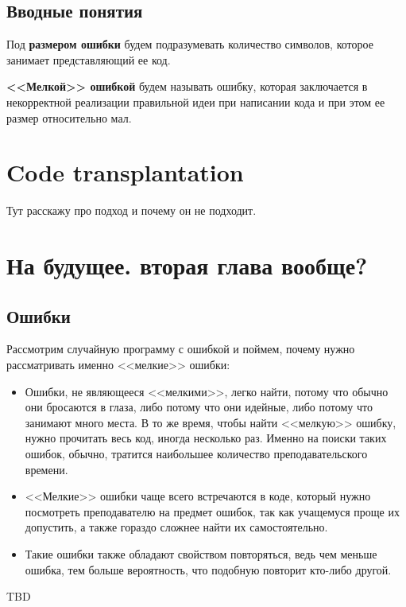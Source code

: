 \subsection{Вводные понятия}

Под \textbf{размером ошибки} будем подразумевать количество символов, которое занимает представляющий ее код.

\textbf{<<Мелкой>> ошибкой} будем называть ошибку, которая заключается в некорректной реализации правильной идеи при написании кода
и при этом ее размер относительно мал.

\section{Code transplantation}
Тут расскажу про подход и почему он не подходит.

\section{На будущее. вторая глава вообще?}

\subsection{Ошибки}
Рассмотрим случайную программу с ошибкой и поймем, почему нужно рассматривать именно <<мелкие>> ошибки:
\begin{itemize}
    \item Ошибки, не являющееся <<мелкими>>, легко найти, потому что обычно они бросаются в глаза, либо потому что
        они идейные, либо потому что занимают много места. В то же время, чтобы найти <<мелкую>> ошибку, нужно прочитать
        весь код, иногда несколько раз. Именно на поиски таких ошибок, обычно, тратится наибольшее количество
        преподавательского времени.
    \item <<Мелкие>> ошибки чаще всего встречаются в коде, который нужно посмотреть преподавателю на предмет ошибок, 
        так как учащемуся проще их допустить, а также гораздо сложнее найти их самостоятельно.
    \item Такие ошибки также обладают свойством повторяться, ведь чем меньше ошибка, тем больше вероятность, что подобную
        повторит кто-либо другой.
\end{itemize}
\chapterconclusion

TBD